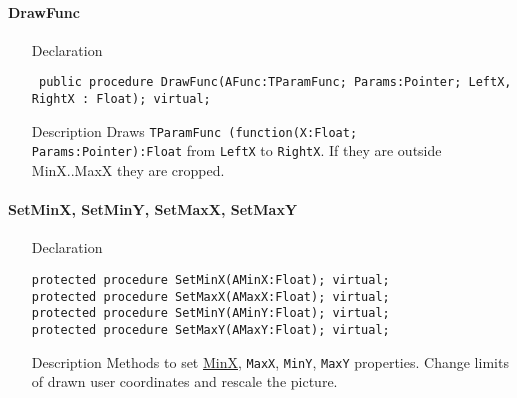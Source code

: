 \documentclass[12pt,a4paper,oneside]{report}
\newcommand{\declarationitem}[1]{{\addfontfeatures{FakeBold=1.3} #1}}
\newcommand{\descriptiontitle}[1]{{\addfontfeatures{FakeSlant}#1}}
\newcommand{\code}[1]{\texttt{#1}}
\begin{document}
\paragraph{DrawFunc}\hspace*{\fill}\label{lmcoordsys.TCoordSys-DrawFunc}
\begin{itemize}\item[\declarationitem{Declaration}\hfill]
\begin{flushleft}
\code{
public procedure DrawFunc(AFunc:TParamFunc; Params:Pointer; LeftX, RightX : Float); virtual;}
\end{flushleft}
\item[\descriptiontitle{Description}]
Draws \code{TParamFunc (function(X:Float; Params:Pointer):Float} from \code{LeftX} to \code{RightX}. If they are outside MinX..MaxX they are cropped.
\end{itemize}
\paragraph{SetMinX, SetMinY, SetMaxX, SetMaxY}\hspace*{\fill}
\begin{itemize}\item[\declarationitem{Declaration}\hfill]
	\label{lmcoordsys.TCoordSys-SetMinX}
	\label{lmcoordsys.TCoordSys-SetMaxX}
	\label{lmcoordsys.TCoordSys-SetMinY}
	\label{lmcoordsys.TCoordSys-SetMaxY}
	\begin{flushleft}
		\code{protected procedure SetMinX(AMinX:Float); virtual;\\
			protected procedure SetMaxX(AMaxX:Float); virtual;\\
			protected procedure SetMinY(AMinY:Float); virtual;\\
			protected procedure SetMaxY(AMaxY:Float); virtual;}
	\end{flushleft}
	\item[\descriptiontitle{Description}] Methods to set \hyperref[lmcoordsys.TCoordSys-MinX]{MinX}, \code{MaxX}, \code{MinY}, \code{MaxY} properties. Change limits of drawn user coordinates and rescale the picture.
\end{itemize}
\end{document}
